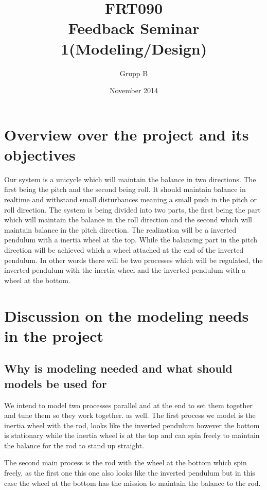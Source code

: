 \documentclass{article}
\author{Grupp B}
\title{FRT090 \\Feedback Seminar 1(Modeling/Design)  }				%
\date{November 2014}
\begin{document}
\maketitle	%
\newpage


\section {Overview over the project and its objectives}

Our system is a unicycle which will maintain the balance in two directions. The first being the pitch and the second being roll. It should maintain balance in realtime and withstand small disturbances meaning a small push in the pitch or roll direction. The system is being divided into two parts, the first being the part which will maintain the balance in the roll direction and the second which will maintain balance in the pitch direction. The realization will be a inverted pendulum with a inertia wheel at the top. While the balancing part in the pitch direction will be achieved which a wheel attached at the end of the inverted pendulum. In other words there will be two processes which will be regulated, the inverted pendulum  with the inertia wheel and the inverted pendulum with a wheel at the bottom. 



\section{Discussion on the modeling needs in the project}

\subsection{Why is modeling needed and what should models be used for}

We intend to model two processes parallel and at the end to set them together and tune them so they work together. as well. The first process we model is the inertia wheel with the rod, looks like the inverted pendulum however the bottom is stationary while the inertia wheel is at the top and can spin freely to maintain the balance for the rod to stand up straight.

The second main process is the rod with the wheel at the bottom which spin freely, as the first one this one also looks like the inverted pendulum but in this case the wheel at the bottom has the mission to maintain the balance to the rod. 
\end{document}
